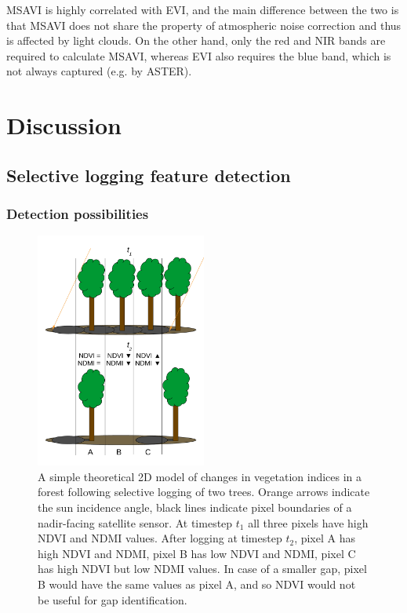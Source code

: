 \documentclass[a4paper,12pt]{scrbook}
\begin{document}
\ac{MSAVI} is highly correlated with \ac{EVI}, and the main difference between the two is that \ac{MSAVI} does not share the property of atmospheric noise correction and thus is affected by light clouds. On the other hand, only the red and \ac{NIR} bands are required to calculate \ac{MSAVI}, whereas \ac{EVI} also requires the blue band, which is not always captured (e.g. by \ac{ASTER}).

\chapter{Discussion}

\section{Selective logging feature detection}

\subsection{Detection possibilities}

\begin{figure}
  \centering
  \includegraphics[width=0.5\textwidth]{thesis-figures/15-gap-vi-model}
  \caption{A simple theoretical 2D model of changes in vegetation indices in a forest following selective logging of two trees. Orange arrows indicate the sun incidence angle, black lines indicate pixel boundaries of a nadir-facing satellite sensor. At timestep $ t_{1} $ all three pixels have high \ac{NDVI} and \ac{NDMI} values. After logging at timestep $ t_{2} $, pixel A has high \ac{NDVI} and \ac{NDMI}, pixel B has low \ac{NDVI} and \ac{NDMI}, pixel C has high \ac{NDVI} but low \ac{NDMI} values. In case of a smaller gap, pixel B would have the same values as pixel A, and so \ac{NDVI} would not be useful for gap identification.}
  \label{fig-gap-vi-model}
\end{figure}
\end{document}
